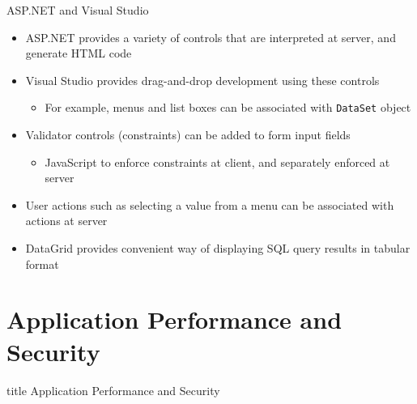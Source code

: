 \documentclass[aspectratio=169, xcolor=dvipsnames]{beamer}
\begin{document}
\begin{frame}{ASP.NET and Visual Studio}
    \begin{itemize}[<+->]
        \item ASP.NET provides a variety of controls that are interpreted at server, and generate HTML code
        \item Visual Studio provides drag-and-drop development using these controls
        \begin{itemize}
            \item[$\triangleright$] For example, menus and list boxes can be associated with \texttt{DataSet} object
        \end{itemize}
        \item Validator controls (constraints) can be added to form input fields
        \begin{itemize}
            \item[$\triangleright$] JavaScript to enforce constraints at client, and separately enforced at server
        \end{itemize}
        \item User actions such as selecting a value from a menu can be associated with actions at server
        \item DataGrid provides convenient way of displaying SQL query results in tabular format
    \end{itemize}
\end{frame}

\section{Application Performance and Security}
\begin{frame}
  \vfill
  \centering
  \begin{beamercolorbox}[sep=8pt,center,shadow=true,rounded=true]{title}
    Application Performance and Security\par%
  \end{beamercolorbox}
  \vfill
\end{frame}
\end{document}
